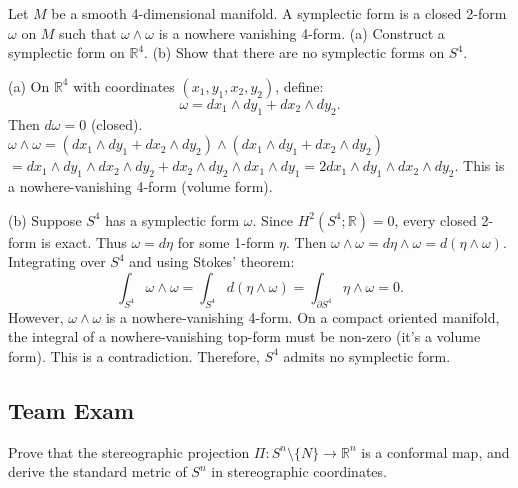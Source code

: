 \begin{exercise}
\label{geometry:2010:6}
Let $M$ be a smooth 4-dimensional manifold. A symplectic form is a closed 2-form $\omega$ on $M$ such that $\omega \wedge \omega$ is a nowhere vanishing 4-form.
(a) Construct a symplectic form on $\mathbb{R}^{4}$.
(b) Show that there are no symplectic forms on $S^{4}$.
\end{exercise}

\begin{solution}
(a) On $\mathbb{R}^4$ with coordinates $(x_1, y_1, x_2, y_2)$, define:
\[ \omega = dx_1 \wedge dy_1 + dx_2 \wedge dy_2. \]
Then $d\omega = 0$ (closed).
$\omega \wedge \omega = (dx_1 \wedge dy_1 + dx_2 \wedge dy_2) \wedge (dx_1 \wedge dy_1 + dx_2 \wedge dy_2)$
$= dx_1 \wedge dy_1 \wedge dx_2 \wedge dy_2 + dx_2 \wedge dy_2 \wedge dx_1 \wedge dy_1 = 2 dx_1 \wedge dy_1 \wedge dx_2 \wedge dy_2$.
This is a nowhere-vanishing 4-form (volume form).

(b) Suppose $S^4$ has a symplectic form $\omega$.
Since $H^2(S^4; \mathbb{R}) = 0$, every closed 2-form is exact.
Thus $\omega = d\eta$ for some 1-form $\eta$.
Then $\omega \wedge \omega = d\eta \wedge \omega = d(\eta \wedge \omega)$.
Integrating over $S^4$ and using Stokes' theorem:
\[ \int_{S^4} \omega \wedge \omega = \int_{S^4} d(\eta \wedge \omega) = \int_{\partial S^4} \eta \wedge \omega = 0. \]
However, $\omega \wedge \omega$ is a nowhere-vanishing 4-form. On a compact oriented manifold, the integral of a nowhere-vanishing top-form must be non-zero (it's a volume form).
This is a contradiction. Therefore, $S^4$ admits no symplectic form.
\end{solution}

\subsection{Team Exam}

\begin{exercise}
\label{geometry:2010:7}
Prove that the stereographic projection $\Pi: S^n \setminus \{N\} \to \mathbb{R}^n$ is a conformal map, and derive the standard metric of $S^n$ in stereographic coordinates.
\end{exercise}

